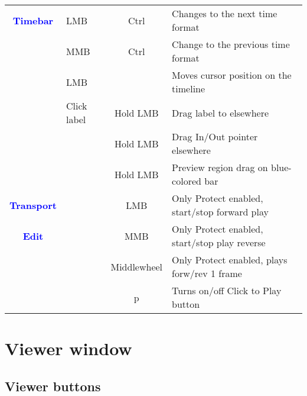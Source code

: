 \begin{center}
\begin{longtable}{ >{\bfseries}c l c p{6cm}}
        \midrule
        \textcolor{blue}{Timebar} & LMB & Ctrl & Changes to the next time format \\        
        & MMB & Ctrl & Change to the previous time format \\        
        & LMB &  & Moves cursor position on the timeline \\        
        & Click label & Hold LMB & Drag label to elsewhere \\        
        &  & Hold LMB & Drag In/Out pointer elsewhere \\        
        &  & Hold LMB & Preview region drag on blue-colored bar \\        
        \midrule        
        \textcolor{blue}{Transport} &  & LMB & Only Protect enabled, start/stop forward play \\
        \midrule
        \textcolor{blue}{Edit} &  & MMB & Only Protect enabled, start/stop play reverse \\        
        &  & Middlewheel & Only Protect enabled, plays forw/rev 1 frame \\        
        &  & p & Turns on/off Click to Play button \\
        
        \bottomrule  
    \end{longtable}
\end{center}

\section{Viewer window }%
\label{sec:viewer_window}

\subsection{Viewer buttons }%
\label{ssec:viewer_buttons}

